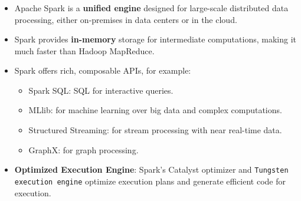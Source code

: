 \begin{frame}
    \frametitle{\subsecname}
    \begin{itemize}
        \item Apache Spark is a \textbf{unified engine} designed for large-scale distributed data processing, either on-premises in data centers or in the cloud.
        \item Spark provides \textbf{in-memory} storage for intermediate computations, making it much faster than Hadoop MapReduce.
        \item Spark offers rich, composable APIs, for example:
        \begin{itemize}
            \item Spark SQL: SQL for interactive queries.
            \item MLlib: for machine learning over big data and complex computations.
            \item Structured Streaming: for stream processing with near real-time data.
            \item GraphX: for graph processing.
        \end{itemize}
        \item \textbf{Optimized Execution Engine}: Spark's Catalyst optimizer and \texttt{Tungsten execution engine} optimize execution plans and generate efficient code for execution.
    \end{itemize}
\end{frame}


